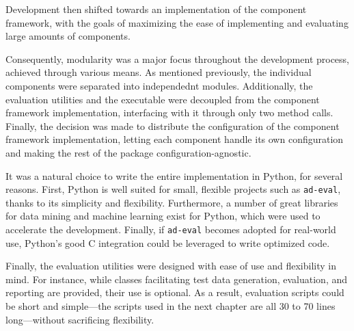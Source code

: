 Development then shifted towards an implementation of the component framework, with the goals of maximizing the ease of implementing and evaluating large amounts of components.

Consequently, modularity was a major focus throughout the development process, achieved through various means. As mentioned previously, the individual components were separated into independednt modules. Additionally, the evaluation utilities and the executable were decoupled from the component framework implementation, interfacing with it through only two method calls. Finally, the decision was made to distribute the configuration of the component framework implementation, letting each component handle its own configuration and making the rest of the package configuration-agnostic.

It was a natural choice to write the entire implementation in Python, for several reasons. First, Python is well suited for small, flexible projects such as \texttt{ad-eval}, thanks to its simplicity and flexibility. Furthermore, a number of great libraries for data mining and machine learning exist for Python, which were used to accelerate the development. Finally, if \texttt{ad-eval} becomes adopted for real-world use, Python's good C integration could be leveraged to write optimized code. 

Finally, the evaluation utilities were designed with ease of use and flexibility in mind. For instance, while classes facilitating test data generation, evaluation, and reporting are provided, their use is optional. As a result, evaluation scripts could be short and simple---the scripts used in the next chapter are all 30 to 70 lines long---without sacrificing flexibility.


